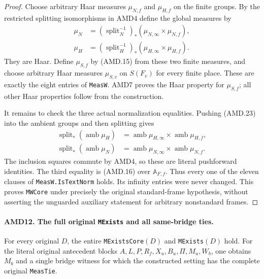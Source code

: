 \begin{proof}
Choose arbitrary Haar measures \(\mu_{N,f}\) and \(\mu_{H,f}\)
on the finite groups.  By the restricted splitting isomorphisms
in AMD4 define the global measures by
\[
\begin{split}
 \mu_N&=(\operatorname{split}_N^{-1})_*
                  (\mu_{N,\infty}\times\mu_{N,f}),\\
 \mu_H&=(\operatorname{split}_H^{-1})_*
                  (\mu_{H,\infty}\times\mu_{H,f}).
\end{split}
 \tag{AMD.23}
\]
They are Haar.  Define \(\mu_{S,f}\) by (AMD.15) from these
two finite measures, and choose arbitrary Haar measures
\(\mu_{S,v}\) on \(S(F_v)\) for every finite place.
These are exactly the eight entries of \texttt{MeasW}.
AMD7 proves the Haar property for \(\mu_{S,f}\); all other
Haar properties follow from the construction.

It remains to check the three actual normalization equalities.
Pushing (AMD.23) into the ambient groups and then splitting gives
\[
\begin{split}
 \operatorname{split}_*(\operatorname{amb}\mu_H)
   &=\operatorname{amb}\mu_{H,\infty}
                       \times\operatorname{amb}\mu_{H,f},\\
 \operatorname{split}_*(\operatorname{amb}\mu_N)
   &=\operatorname{amb}\mu_{N,\infty}
                       \times\operatorname{amb}\mu_{N,f}.
\end{split}
 \tag{AMD.24}
\]
The inclusion squares commute by AMD4, so these are literal
pushforward identities.  The third equality is (AMD.16) over
\(\mathbb A_{F,f}\).  Thus every one of the eleven clauses of
\texttt{MeasW.IsTextNorm} holds.  Its infinity entries were
never changed.  This proves \texttt{MWCore} under precisely
the original standard-frame hypothesis, without asserting the
unguarded auxiliary statement for arbitrary nonstandard frames.
\end{proof}

\paragraph{AMD12. The full original \texttt{MExists} and all same-bridge ties.}
\label{claim:AMD12}
For every original \(D\), the entire \texttt{MExistsCore}\((D)\)
and \texttt{MExists}\((D)\) hold.  For the literal original
antecedent blocks \(A,L,P,R_f,X_u,B_u,\Pi,M_u,W_b\), one
obtains \(M_b\) and a single bridge witness for which the
constructed setting has the complete original \texttt{MeasTie}.

